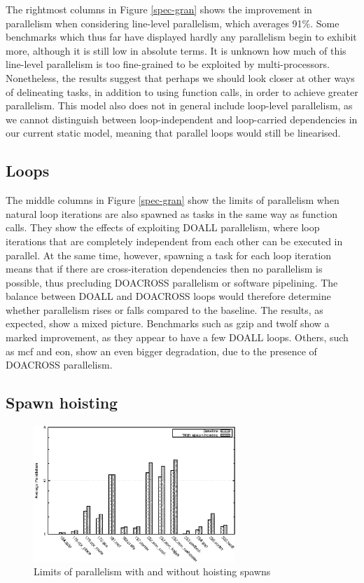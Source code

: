 The rightmost columns in Figure \ref{spec-gran} shows the improvement in parallelism when considering line-level parallelism, which averages 91\%.
Some benchmarks which thus far have displayed hardly any parallelism begin to exhibit more, although it is still low in absolute terms.
It is unknown how much of this line-level parallelism is too fine-grained to be exploited by multi-processors.
Nonetheless, the results suggest that perhaps we should look closer at other ways of delineating tasks, in addition to using function calls, in order to achieve greater parallelism.
This model also does not in general include loop-level parallelism, as we cannot distinguish between loop-independent and loop-carried dependencies in our current static model, meaning that parallel loops would still be linearised.

\subsection{Loops}

The middle columns in Figure \ref{spec-gran} show the limits of parallelism when natural loop iterations are also spawned as tasks in the same way as function calls.
They show the effects of exploiting DOALL parallelism, where loop iterations that are completely independent from each other can be executed in parallel.
At the same time, however, spawning a task for each loop iteration means that if there are cross-iteration dependencies then no parallelism is possible, thus precluding DOACROSS parallelism or software pipelining.
The balance between DOALL and DOACROSS loops would therefore determine whether parallelism rises or falls compared to the baseline.
The results, as expected, show a mixed picture.
Benchmarks such as gzip and twolf show a marked improvement, as they appear to have a few DOALL loops.
Others, such as mcf and eon, show an even bigger degradation, due to the presence of DOACROSS parallelism.

\subsection{Spawn hoisting}

\begin{figure}
 \centering
 \includegraphics[width=3in]{spec-hoist}
 \caption{Limits of parallelism with and without hoisting spawns}
 \label{spec-hoist}
\end{figure}

